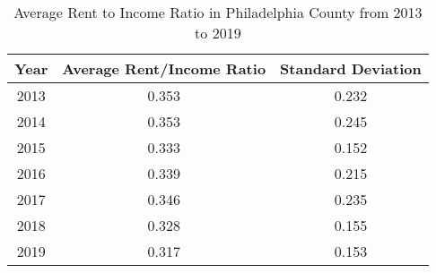 \begin{table}[ht]
\centering
\begin{tabular}{|c|c|c|}
\hline
Year & Average Rent/Income Ratio & Standard Deviation \\ \hline
2013 & 0.353 & 0.232 \\ \hline
2014 & 0.353 & 0.245 \\ \hline
2015 & 0.333 & 0.152 \\ \hline
2016 & 0.339 & 0.215 \\ \hline
2017 & 0.346 & 0.235 \\ \hline
2018 & 0.328 & 0.155 \\ \hline
2019 & 0.317 & 0.153 \\ \hline
\end{tabular}
\caption{Average Rent to Income Ratio in Philadelphia County from 2013 to 2019}
\end{table}